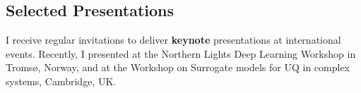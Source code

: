 \documentclass[a4paper,10pt]{article}
\begin{document}








\subsection*{Selected Presentations}

I receive regular invitations to deliver {\bf keynote} presentations at international events. 
Recently, I presented at the Northern Lights Deep Learning Workshop in Troms\o, Norway, and at the Workshop on Surrogate models for UQ in complex systems, Cambridge, UK.
\end{document}
